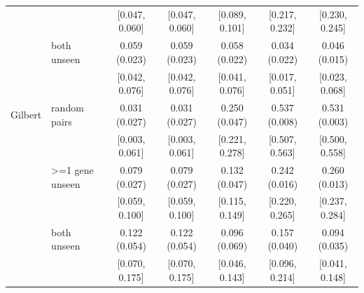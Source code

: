 \begin{tabular}{ll|ccccc}
 & & \scriptsize[0.047, 0.060] & \scriptsize[0.047, 0.060] & \scriptsize[0.089, 0.101] & \scriptsize[0.217, 0.232] & \scriptsize[0.230, 0.245] \\
 & both unseen & 0.059 (0.023) & 0.059 (0.023) & 0.058 (0.022) & 0.034 (0.022) & 0.046 (0.015) \\
 & & \scriptsize[0.042, 0.076] & \scriptsize[0.042, 0.076] & \scriptsize[0.041, 0.076] & \scriptsize[0.017, 0.051] & \scriptsize[0.023, 0.068] \\
\hline
Gilbert & random pairs & 0.031 (0.027) & 0.031 (0.027) & 0.250 (0.047) & 0.537 (0.008) & 0.531 (0.003) \\
 & & \scriptsize[0.003, 0.061] & \scriptsize[0.003, 0.061] & \scriptsize[0.221, 0.278] & \scriptsize[0.507, 0.563] & \scriptsize[0.500, 0.558] \\
 & >=1 gene unseen & 0.079 (0.027) & 0.079 (0.027) & 0.132 (0.047) & 0.242 (0.016) & 0.260 (0.013) \\
 & & \scriptsize[0.059, 0.100] & \scriptsize[0.059, 0.100] & \scriptsize[0.115, 0.149] & \scriptsize[0.220, 0.265] & \scriptsize[0.237, 0.284] \\
 & both unseen & 0.122 (0.054) & 0.122 (0.054) & 0.096 (0.069) & 0.157 (0.040) & 0.094 (0.035) \\
 & & \scriptsize[0.070, 0.175] & \scriptsize[0.070, 0.175] & \scriptsize[0.046, 0.143] & \scriptsize[0.096, 0.214] & \scriptsize[0.041, 0.148] \\
\hline
\end{tabular}
